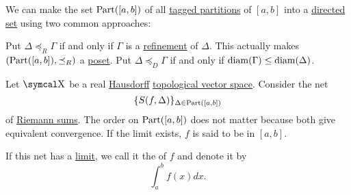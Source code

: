 \begin{definition}\label{def:riemann_integral}
  We can make the set \( \operatorname{Part}([a, b]) \) of all \hyperref[def:riemann_partition/tagged]{tagged partitions} of \( [a, b] \) into a \hyperref[def:directed_set]{directed set} using two common approaches:
  \begin{DefEnum}
     Put \( \Delta \preceq_R \Gamma \) if and only if \( \Gamma \) is a \hyperref[def:riemann_partition/refinement]{refinement} of \( \Delta \). This actually makes \( (\operatorname{Part}([a, b]), \preceq_R) \) a \hyperref[def:poset]{poset}.
     Put \( \Delta \preceq_D \Gamma \) if and only if \( \operatorname{diam}(\Gamma) \leq \operatorname{diam}(\Delta) \).
  \end{DefEnum}

  Let \( \CX \) be a real \hyperref[def:separation_axioms/T2]{Hausdorff} \hyperref[def:topological_vector_space]{topological vector space}. Consider the net
  \begin{equation}\label{eq:def:riemann_integral/net}
    \{ S(f, \Delta) \}_{\Delta \in \operatorname{Part}([a, b])}
  \end{equation}
  of \hyperref[def:riemann_sum]{Riemann sums}. The order on \( \operatorname{Part}([a, b]) \) does not matter because both give equivalent convergence. If the limit exists, \( f \) is said to be  in \( [a, b] \).

  If this net has a \hyperref[def:net_convergence/limit]{limit}, we call it the  of \( f \) and denote it by
  \begin{equation}\label{eq:def:riemann_integral}
    \int_a^b f(x) dx.
  \end{equation}
\end{definition}
